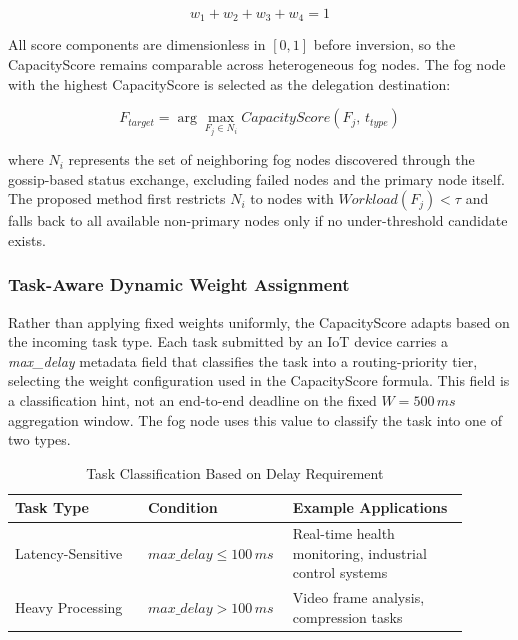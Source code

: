 \documentclass[conference]{IEEEtran}
\begin{document}
    \begin{equation}
    w_1 + w_2 + w_3 + w_4 = 1
    \end{equation}

    All score components are dimensionless in $[0,1]$ before inversion, so the CapacityScore remains comparable across heterogeneous fog nodes. The fog node with the highest CapacityScore is selected as the delegation destination:

    \begin{equation}
    F_{target} = \arg\max_{F_j \in N_i} CapacityScore(F_j,\,t_{type})
    \end{equation}

    where $N_i$ represents the set of neighboring fog nodes discovered through the gossip-based status exchange, excluding failed nodes and the primary node itself. The proposed method first restricts $N_i$ to nodes with $Workload(F_j)<\tau$ and falls back to all available non-primary nodes only if no under-threshold candidate exists.


    \subsubsection{Task-Aware Dynamic Weight Assignment}

    Rather than applying fixed weights uniformly, the CapacityScore adapts based on the incoming task type. Each task submitted by an IoT device carries a \textit{max\_delay} metadata field that classifies the task into a routing-priority tier, selecting the weight configuration used in the CapacityScore formula. This field is a classification hint, not an end-to-end deadline on the fixed $W=500\,ms$ aggregation window. The fog node uses this value to classify the task into one of two types.

    \begin{table}[htbp]
    \caption{Task Classification Based on Delay Requirement}
    \label{table:task-classification}
    \centering
    \begingroup
    \setlength{\tabcolsep}{3pt}
    \renewcommand{\arraystretch}{1.15}
    \begin{tabular}{@{}>{\raggedright\arraybackslash}p{0.28\linewidth}>{\raggedright\arraybackslash}p{0.25\linewidth}>{\raggedright\arraybackslash}p{0.37\linewidth}@{}}
    \hline
    \textbf{Task Type} & \textbf{Condition} & \textbf{Example Applications} \\
    \hline
    Latency-Sensitive & $max\_delay \leq 100\,ms$ & Real-time health monitoring, industrial control systems \\
    Heavy Processing & $max\_delay > 100\,ms$ & Video frame analysis, compression tasks \\
    \hline
    \end{tabular}
    \endgroup
    \end{table}
\end{document}
